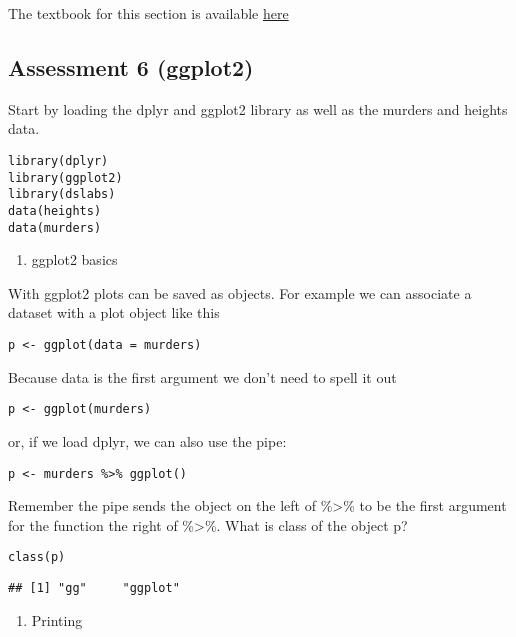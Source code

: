 \documentclass[]{article}
\providecommand{\tightlist}{%
  \setlength{\itemsep}{0pt}\setlength{\parskip}{0pt}}
\begin{document}
The textbook for this section is available
\href{https://rafalab.github.io/dsbook/ggplot2.html}{here}

\hypertarget{assessment-6-ggplot2}{%
\subsection{Assessment 6 (ggplot2)}\label{assessment-6-ggplot2}}

Start by loading the dplyr and ggplot2 library as well as the murders
and heights data.

\begin{verbatim}
library(dplyr)
library(ggplot2)
library(dslabs)
data(heights)
data(murders)
\end{verbatim}

\begin{enumerate}
\def\labelenumi{\arabic{enumi}.}
\tightlist
\item
  ggplot2 basics
\end{enumerate}

With ggplot2 plots can be saved as objects. For example we can associate
a dataset with a plot object like this

\begin{verbatim}
p <- ggplot(data = murders)
\end{verbatim}

Because data is the first argument we don't need to spell it out

\begin{verbatim}
p <- ggplot(murders)
\end{verbatim}

or, if we load dplyr, we can also use the pipe:

\begin{verbatim}
p <- murders %>% ggplot()
\end{verbatim}

Remember the pipe sends the object on the left of \%\textgreater{}\% to
be the first argument for the function the right of \%\textgreater{}\%.
What is class of the object p?

\begin{verbatim}
class(p)
\end{verbatim}

\begin{verbatim}
## [1] "gg"     "ggplot"
\end{verbatim}

\begin{enumerate}
\def\labelenumi{\arabic{enumi}.}
\setcounter{enumi}{1}
\tightlist
\item
  Printing
\end{enumerate}
\end{document}
